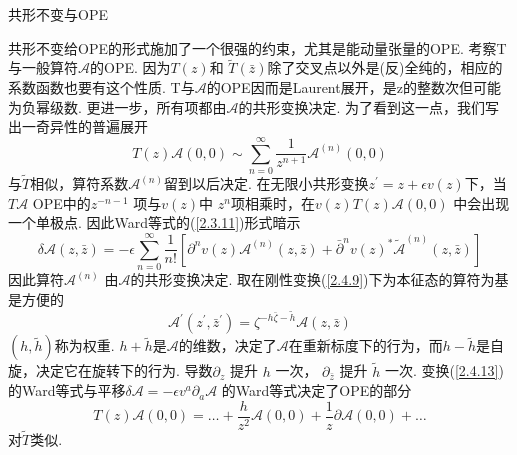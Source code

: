 \centerline{\Large 共形不变与OPE}
共形不变给OPE的形式施加了一个很强的约束，尤其是能动量张量的OPE. 考察T与一般算符$\mathscr{A}$的OPE. 因为$T(z)$和 $\tilde{T}(\bar{z})$除了交叉点以外是(反)全纯的，相应的系数函数也要有这个性质. T与$\mathscr{A}$的OPE因而是Laurent展开，是z的整数次但可能为负幂级数. 更进一步，所有项都由$\mathscr{A}$的共形变换决定. 为了看到这一点，我们写出一奇异性的普遍展开
\begin{equation}\label{2.4.11}
T(z) \mathscr{A}(0,0) \sim \sum_{n=0}^{\infty} \frac{1}{z^{n+1}} \mathscr{A}^{(n)}(0,0)
\end{equation}
与$\tilde{T}$相似，算符系数$\mathscr{A}^{(n)}$留到以后决定. 在无限小共形变换$z^{\prime}=z+\epsilon v(z)$下，当$T \mathscr{A}$ OPE中的$z^{-n-1}$ 项与$v(z)$中 $z^n$项相乘时，在$v(z) T(z) \mathscr{A}(0,0)$ 中会出现一个单极点. 
因此Ward等式的(\ref{2.3.11})形式暗示
\begin{equation}\label{2.4.12}
\delta \mathscr{A}(z, \bar{z})=-\epsilon \sum_{n=0}^{\infty} \frac{1}{n !}\left[\partial^{n} v(z) \mathscr{A}^{(n)}(z, \bar{z})+\bar{\partial}^{n} v(z)^{*} \tilde{\mathscr{A}}^{(n)}(z, \bar{z})\right]
\end{equation}
因此算符$\mathscr{A}^{(n)}$ 由$\mathscr{A}$的共形变换决定. 取在刚性变换(\ref{2.4.9})下为本征态的算符为基是方便的
\begin{equation}\label{2.4.13}
\mathscr{A}^{\prime}\left(z^{\prime}, \bar{z}^{\prime}\right)=\zeta^{-h \bar{\zeta}-\tilde{h}} \mathscr{A}(z, \bar{z})
\end{equation}
$(h, \tilde{h})$称为权重. $h+ \tilde{h}$是$\mathscr{A}$的维数，决定了$\mathscr{A}$在重新标度下的行为，而$h- \tilde{h}$是自旋，决定它在旋转下的行为. 导数$\partial_z$ 提升 $h$ 一次，  $\partial_{\bar{z}}$ 提升 $\tilde{h}$ 一次. 变换(\ref{2.4.13})的Ward等式与平移$\delta \mathscr{A}=-\epsilon v^{a} \partial_{a} \mathscr{A}$ 的Ward等式决定了OPE的部分
\begin{equation}\label{2.4.14}
T(z) \mathscr{A}(0,0)=\ldots+\frac{h}{z^{2}} \mathscr{A}(0,0)+\frac{1}{z} \partial \mathscr{A}(0,0)+\ldots
\end{equation}
对$\tilde{T}$类似.\\
